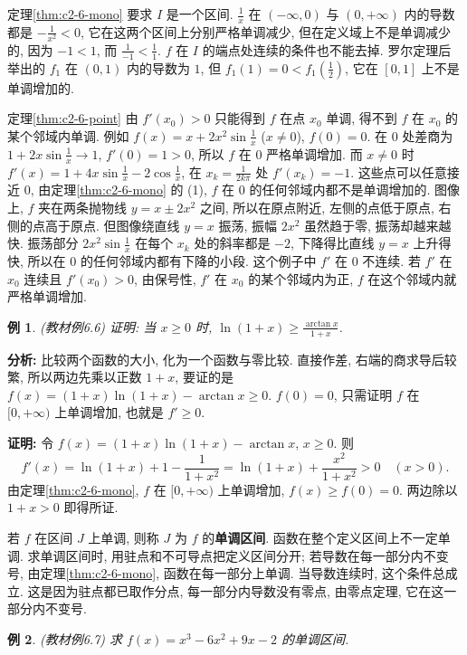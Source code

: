 \documentclass[UTF8,openany]{ctexbook}
\theoremstyle{chinesetextbook}
\newtheorem{example}{例}[section]
\newenvironment{cnproof}{\par\indent\textbf{证明:} \ignorespaces}{\par}
\begin{document}
定理\ref{thm:c2-6-mono} 要求 $I$ 是一个区间. $\displaystyle\frac1x$ 在 $(-\infty,0)$ 与 $(0,+\infty)$ 内的导数都是 $\displaystyle-\frac1{x^2}<0$, 它在这两个区间上分别严格单调减少, 但在定义域上不是单调减少的, 因为 $-1<1$, 而 $\displaystyle\frac1{-1}<\frac11$. $f$ 在 $I$ 的端点处连续的条件也不能去掉. 罗尔定理后举出的 $f_1$ 在 $(0,1)$ 内的导数为 $1$, 但 $\displaystyle f_1(1)=0<f_1\left(\frac12\right)$, 它在 $[0,1]$ 上不是单调增加的.

定理\ref{thm:c2-6-point} 由 $f'(x_0)>0$ 只能得到 $f$ 在点 $x_0$ 单调, 得不到 $f$ 在 $x_0$ 的某个邻域内单调. 例如 $\displaystyle f(x)=x+2x^2\sin\frac1x$ ($x\ne0$), $f(0)=0$. 在 $0$ 处差商为 $\displaystyle1+2x\sin\frac1x\to1$, $f'(0)=1>0$, 所以 $f$ 在 $0$ 严格单调增加. 而 $x\ne0$ 时 $\displaystyle f'(x)=1+4x\sin\frac1x-2\cos\frac1x$, 在 $\displaystyle x_k=\frac1{2k\pi}$ 处 $f'(x_k)=-1$. 这些点可以任意接近 $0$, 由定理\ref{thm:c2-6-mono} 的 (1), $f$ 在 $0$ 的任何邻域内都不是单调增加的. 图像上, $f$ 夹在两条抛物线 $y=x\pm2x^2$ 之间, 所以在原点附近, 左侧的点低于原点, 右侧的点高于原点. 但图像绕直线 $y=x$ 振荡, 振幅 $2x^2$ 虽然趋于零, 振荡却越来越快. 振荡部分 $\displaystyle2x^2\sin\frac1x$ 在每个 $x_k$ 处的斜率都是 $-2$, 下降得比直线 $y=x$ 上升得快, 所以在 $0$ 的任何邻域内都有下降的小段. 这个例子中 $f'$ 在 $0$ 不连续. 若 $f'$ 在 $x_0$ 连续且 $f'(x_0)>0$, 由保号性, $f'$ 在 $x_0$ 的某个邻域内为正, $f$ 在这个邻域内就严格单调增加.
\begin{example}\label{ex:c2-6-6}
\textnormal{(教材例6.6)} 证明: 当 $x\ge0$ 时, $\displaystyle\ln(1+x)\ge\frac{\arctan x}{1+x}$.
\end{example}
\par\indent\textbf{分析:} 比较两个函数的大小, 化为一个函数与零比较. 直接作差, 右端的商求导后较繁, 所以两边先乘以正数 $1+x$, 要证的是 $f(x)=(1+x)\ln(1+x)-\arctan x\ge0$. $f(0)=0$, 只需证明 $f$ 在 $[0,+\infty)$ 上单调增加, 也就是 $f'\ge0$.
\begin{cnproof}
令 $f(x)=(1+x)\ln(1+x)-\arctan x$, $x\ge0$. 则
\[
f'(x)=\ln(1+x)+1-\frac1{1+x^2}=\ln(1+x)+\frac{x^2}{1+x^2}>0\quad(x>0).
\]
由定理\ref{thm:c2-6-mono}, $f$ 在 $[0,+\infty)$ 上单调增加, $f(x)\ge f(0)=0$. 两边除以 $1+x>0$ 即得所证.
\end{cnproof}
若 $f$ 在区间 $J$ 上单调, 则称 $J$ 为 $f$ 的\textbf{单调区间}. 函数在整个定义区间上不一定单调. 求单调区间时, 用驻点和不可导点把定义区间分开; 若导数在每一部分内不变号, 由定理\ref{thm:c2-6-mono}, 函数在每一部分上单调. 当导数连续时, 这个条件总成立. 这是因为驻点都已取作分点, 每一部分内导数没有零点, 由零点定理, 它在这一部分内不变号.
\begin{example}\label{ex:c2-6-7}
\textnormal{(教材例6.7)} 求 $f(x)=x^3-6x^2+9x-2$ 的单调区间.
\end{example}
\end{document}
